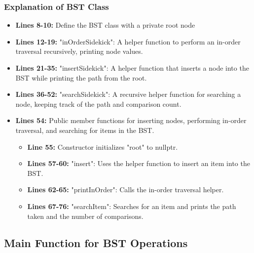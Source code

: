 \documentclass{article}
\begin{document}
\subsubsection{Explanation of BST Class}
\begin{itemize}
    \item \textbf{Lines 8-10:} Define the BST class with a private root node
    \item \textbf{Lines 12-19:} "inOrderSidekick": A helper function to perform an in-order traversal recursively, printing node values.
    \item \textbf{Lines 21-35:} "insertSidekick": A helper function that inserts a node into the BST while printing the path from the root.
    \item \textbf{Lines 36-52:} "searchSidekick": A recursive helper function for searching a node, keeping track of the path and comparison count.
    \item \textbf{Lines 54:} Public member functions for inserting nodes, performing in-order traversal, and searching for items in the BST.
    \begin{itemize}
        \item \textbf{Line 55:} Constructor initializes "root" to nullptr.
        \item \textbf{Lines 57-60:} "insert": Uses the helper function to insert an item into the BST.
        \item \textbf{Lines 62-65:} "printInOrder": Calls the in-order traversal helper.
        \item \textbf{Lines 67-76:} "searchItem": Searches for an item and prints the path taken and the number of comparisons.
    \end{itemize}
\end{itemize}

\subsection{Main Function for BST Operations}
\end{document}
